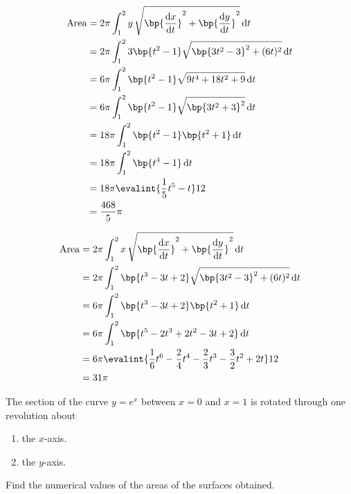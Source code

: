 \documentclass{echw}
\begin{document}
            \subpart
                \begin{align*}
                    \area &= 2\pi \int_1^2 y \, \sqrt{\bp{\der{x}{t}}^2 + \bp{\der{y}{t}}^2} \d t\\
                    &= 2\pi \int_1^2 3\bp{t^2 - 1} \sqrt{\bp{3t^2 - 3}^2 + (6t)^2} \d t\\
                    &= 6\pi \int_1^2 \bp{t^2 - 1} \sqrt{9t^4 + 18t^2 + 9} \d t\\
                    &= 6\pi \int_1^2 \bp{t^2 - 1} \sqrt{\bp{3t^2 + 3}^2} \d t\\
                    &= 18\pi \int_1^2 \bp{t^2-1}\bp{t^2 + 1} \d t\\
                    &= 18\pi \int_1^2 \bp{t^4 - 1} \d t\\
                    &= 18\pi \evalint{\dfrac15 t^5 - t}12\\
                    &= \dfrac{468}5 \pi
                \end{align*}

                

            \subpart
                \begin{align*}
                    \area &= 2\pi \int_1^2 x \, \sqrt{\bp{\der{x}{t}}^2 + \bp{\der{y}{t}}^2} \d t\\
                    &= 2\pi \int_1^2 \bp{t^3 - 3t + 2} \sqrt{\bp{3t^2 - 3}^2 + (6t)^2} \d t\\
                    &= 6\pi \int_1^2 \bp{t^3 - 3t + 2} \bp{t^2 + 1} \d t\\
                    &= 6\pi \int_1^2 \bp{t^5 - 2t^3 + 2t^2 - 3t + 2} \d t\\
                    &= 6\pi \evalint{\dfrac16 t^6 - \dfrac24 t^4 - \dfrac23 t^3 - \dfrac32 t^2 + 2t}12\\
                    &= 31 \pi
                \end{align*}


    \problem{}
        The section of the curve $y = e^x$ between $x = 0$ and $x = 1$ is rotated through one revolution about
        \begin{enumerate}
            \item the $x$-axis.
            \item the $y$-axis.
        \end{enumerate}
        Find the numerical values of the areas of the surfaces obtained.
    
\end{document}
